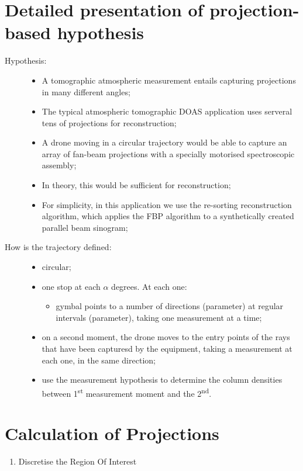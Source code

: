 \section{Detailed presentation of projection-based hypothesis}%
\label{sec:detailed_presentation_of_projection_based_hypothesis}

\begin{description}
    \item[Hypothesis:]
        \begin{itemize}
            \item A tomographic atmospheric measurement entails
                capturing projections in many different angles;
            \item The typical atmospheric tomographic DOAS application
                uses serveral tens of projections for reconstruction;
            \item A drone moving in a circular trajectory would be able
                to capture an array of fan-beam projections with a
                specially motorised spectroscopic assembly;
            \item In theory, this would be sufficient for
                reconstruction;
            \item For simplicity, in this application we use the
                re-sorting reconstruction algorithm, which applies the
                FBP algorithm to a synthetically created parallel beam
                sinogram;
        \end{itemize}
    \item[How is the trajectory defined:\\]
        \begin{itemize}
            \item circular;
            \item one stop at each $\alpha$ degrees. At each one:
                \begin{itemize}
                    \item gymbal points to a number of directions
                        (parameter) at regular intervals (parameter),
                        taking one measurement at a time;
                \end{itemize}
            \item on a second moment, the drone moves to the entry
                points of the rays that have been capturesd by the
                equipment, taking a measurement at each one, in the same
                direction;
            \item use the measurement hypothesis to determine the
                column densities between 1\textsuperscript{st}
                measurement moment and the 2\textsuperscript{nd}.
        \end{itemize}
\end{description}

\section{Calculation of Projections}%
\label{sec:calculation_of_projections}

\begin{enumerate}
    \item Discretise the Region Of Interest
\end{enumerate}
